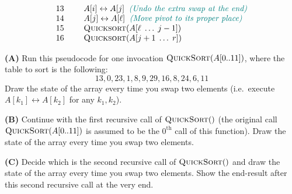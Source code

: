 \documentclass[a4paper,12pt]{article}
\begin{document}
\[\begin{array}{rl}
13 & \hspace{0.5cm} A[i] \leftrightarrow A[j] \;\; \textcolor{teal}{\text{\em (Undo the extra swap at the end)}}\\
14 & \hspace{0.5cm} A[j] \leftrightarrow A[\ell] \;\; \textcolor{teal}{\text{\em (Move pivot to its proper place)}}\\
15 & \hspace{0.5cm} \text{\textsc{Quicksort}}(A[\ell\;\ldots\;j-1])\\
16 & \hspace{0.5cm} \text{\textsc{Quicksort}}(A[j+1\;\ldots\;r])\\
\end{array}
\]


\vspace{5pt}
{\bf (A)}
Run this pseudocode for one invocation $\text{\textsc{QuickSort}}(A[0..11])$, 
where the table to sort is the following: 
$$13, 0, 23, 1, 8, 9, 29, 16, 8, 24, 6, 11$$
Draw the state of the array every time you swap two 
elements (i.e.\ execute $A[k_1] \leftrightarrow A[k_2]$ for any $k_1,k_2$).

\vspace{5pt}
{\bf (B)}
Continue with the first recursive call of $\text{\textsc{QuickSort}}()$
(the original call $\text{\textsc{QuickSort}}(A[0..11])$ is assumed to be the
$0^{\text{th}}$ call of this function). 
Draw the state of the array every time you swap two 
elements. 


\vspace{5pt}
{\bf (C)} Decide which is the second recursive call of 
$\text{\textsc{QuickSort}}()$ and draw the state 
of the array every time you swap two elements. 
Show the end-result 
after this second recursive call at the very end.
\end{document}
